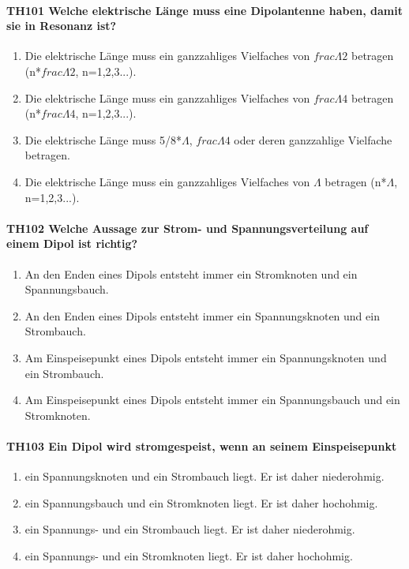\documentclass[8pt]{article}
\begin{document}
\paragraph*{TH101 Welche elektrische Länge muss eine Dipolantenne haben, damit sie in Resonanz ist?}
\begin{enumerate}[nolistsep,label=\Alph*]
\item Die elektrische Länge muss ein ganzzahliges Vielfaches von $frac{\Lambda}{2}$ betragen (n*$frac{\Lambda}{2}$, n=1,2,3...).
\item Die elektrische Länge muss ein ganzzahliges Vielfaches von $frac{\Lambda}{4}$ betragen (n*$frac{\Lambda}{4}$, n=1,2,3...).
\item Die elektrische Länge muss 5/8*$\Lambda$, $frac{\Lambda}{4}$ oder deren ganzzahlige Vielfache betragen. 
\item Die elektrische Länge muss ein ganzzahliges Vielfaches von $\Lambda$ betragen (n*$\Lambda$, n=1,2,3...).
\end{enumerate}

\paragraph*{TH102 Welche Aussage zur Strom- und Spannungsverteilung auf einem Dipol ist richtig?} 
\begin{enumerate}[nolistsep,label=\Alph*]
\item An den Enden eines Dipols entsteht immer ein Stromknoten und ein Spannungsbauch.
\item An den Enden eines Dipols entsteht immer ein Spannungsknoten und ein Strombauch.
\item Am Einspeisepunkt eines Dipols entsteht immer ein Spannungsknoten und ein Strombauch.
\item Am Einspeisepunkt eines Dipols entsteht immer ein Spannungsbauch und ein Stromknoten.
\end{enumerate}

\paragraph*{TH103 Ein Dipol wird stromgespeist, wenn an seinem Einspeisepunkt} 
\begin{enumerate}[nolistsep,label=\Alph*]
\item ein Spannungsknoten und ein Strombauch liegt. Er ist daher niederohmig.
\item ein Spannungsbauch und ein Stromknoten liegt. Er ist daher hochohmig.
\item ein Spannungs- und ein Strombauch liegt. Er ist daher niederohmig.
\item ein Spannungs- und ein Stromknoten liegt. Er ist daher hochohmig.
\end{enumerate}
\end{document}
